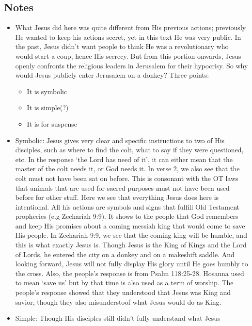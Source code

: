 \subsection*{Notes}
\begin{itemize}
  \item{What Jesus did here was quite different from His previous actions;
  previously He wanted to keep his actions secret, yet in this text He was
  very public.  In the past, Jesus didn't want people to think He was a
  revolutionary who would start a coup, hence His secrecy.  But from this
  portion onwards, Jesus openly confronts the religious leaders in Jerusalem
  for their hypocrisy.  So why would Jesus publicly enter Jerusalem on a
  donkey?  Three points:
  \begin{itemize}
    \item{It is symbolic}
    \item{It is simple(?)}
    \item{It is for suspense}
  \end{itemize}}
  \item{Symbolic: Jesus gives very clear and specific instructions to two of
  His disciples, such as where to find the colt, what to say if they were
  questioned, etc.  In the response `the Lord has need of it', it can either
  mean that the master of the colt needs it, or God needs it.  In verse 2, we
  also see that the colt must not have been sat on before.  This is consonant
  with the OT laws that animals that are used for sacred purposes must not
  have been used before for other stuff.  Here we see that everything Jesus
  does here is intentional.  All his actions are symbols and signs that
  fulfill Old Testament prophecies (e.g Zechariah 9:9).  It shows to the
  people that God remembers and keep His promises about a coming messiah king
  that would come to save His people.  In Zechariah 9:9, we see that the
  coming king will be humble, and this is what exactly Jesus is.  Though
  Jesus is the King of Kings and the Lord of Lords, he entered the city on a
  donkey and on a makeshift saddle.  And looking forward, Jesus will not
  fully display His glory until He goes humbly to the cross.  Also, the
  people's response is from Psalm 118:25-28.  Hosanna used to mean `save us'
  but by that time is also used as a term of worship.  The people's response
  showed that they understood that Jesus was King and savior, though they
  also misunderstoof what Jesus would do as King.}
  \item{Simple: Though His disciples still didn't fully understand what Jesus
}
\end{itemize}
